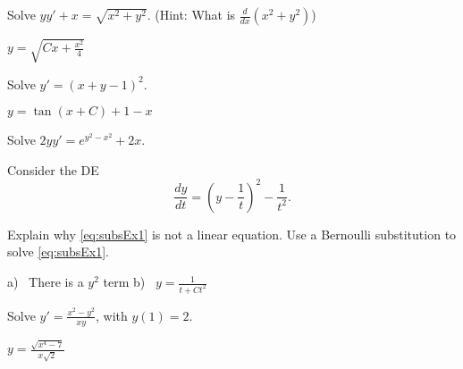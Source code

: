 \begin{exercise}
Solve $yy' + x = \sqrt{x^2 + y^2}$. (Hint: What is $\frac{d}{dx}(x^2 + y^2)$)
\end{exercise}
\comboSol{%
}
{%
$y = \sqrt{Cx + \frac{x^2}{4}}$
}

\begin{exercise}
Solve $y' = {(x+y-1)}^2$.
\end{exercise}
\comboSol{%
}
{%
$y = \tan(x+C) + 1 - x$
}

\begin{exercise}\ansMark
Solve $2yy' = e^{y^2-x^2} + 2x$.
\end{exercise}

\begin{exercise}
Consider the  DE 
\begin{equation}
\frac{dy}{dt}=\left( y -\frac{1}{t} \right)^2 - \frac{1}{t^2}. \label{eq:subsEx1}
\end{equation} %
\begin{tasks}
\task Explain why \eqref{eq:subsEx1} is not a linear equation.
\task Use a Bernoulli substitution to solve \eqref{eq:subsEx1}.
\end{tasks}
\end{exercise}
\comboSol{%
}
{%
a)~ There is a $y^2$ term \quad b)~ $y = \frac{1}{t + Ct^2}$
}

\setcounter{exercise}{100}

\begin{exercise}
Solve $y' = \frac{x^2-y^2}{x y}$, with $y(1) = 2$.
\end{exercise}
\comboSol{%
}
{%
$y = \frac{\sqrt{x^4 - 7}}{x\sqrt{2}}$
}

